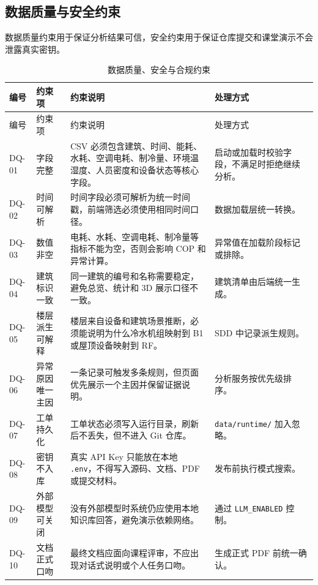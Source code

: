 \documentclass[12pt,a4paper]{ctexart}
\newcommand{\code}[1]{{\footnotesize\nolinkurl{#1}}}
\begin{document}
\subsection{数据质量与安全约束}
数据质量约束用于保证分析结果可信，安全约束用于保证仓库提交和课堂演示不会泄露真实密钥。
\begin{longtable}{L{1.7cm}L{3.0cm}L{6.0cm}L{4.5cm}}
\caption{数据质量、安全与合规约束}\\
\toprule
编号 & 约束项 & 约束说明 & 处理方式 \\
\midrule
\endfirsthead
\toprule
编号 & 约束项 & 约束说明 & 处理方式 \\
\midrule
\endhead
DQ-01 & 字段完整 & CSV 必须包含建筑、时间、能耗、水耗、空调电耗、制冷量、环境温湿度、人员密度和设备状态等核心字段。 & 启动或加载时校验字段，不满足时拒绝继续分析。 \\
DQ-02 & 时间可解析 & 时间字段必须可解析为统一时间戳，前端筛选必须使用相同时间口径。 & 数据加载层统一转换。 \\
DQ-03 & 数值非空 & 电耗、水耗、空调电耗、制冷量等指标不能为空，否则会影响 COP 和异常计算。 & 异常值在加载阶段标记或排除。 \\
DQ-04 & 建筑标识一致 & 同一建筑的编号和名称需要稳定，避免总览、统计和 3D 展示口径不一致。 & 建筑清单由后端统一生成。 \\
DQ-05 & 楼层派生可解释 & 楼层来自设备和建筑场景推断，必须能说明为什么冷水机组映射到 B1 或屋顶设备映射到 RF。 & SDD 中记录派生规则。 \\
DQ-06 & 异常原因唯一主因 & 一条记录可触发多条规则，但页面优先展示一个主因并保留证据说明。 & 分析服务按优先级排序。 \\
DQ-07 & 工单持久化 & 工单状态必须写入运行目录，刷新后不丢失，但不进入 Git 仓库。 & \code{data/runtime/} 加入忽略。 \\
DQ-08 & 密钥不入库 & 真实 API Key 只能放在本地 \code{.env}，不得写入源码、文档、PDF 或提交材料。 & 发布前执行模式搜索。 \\
DQ-09 & 外部模型可关闭 & 没有外部模型时系统仍应使用本地知识库回答，避免演示依赖网络。 & 通过 \code{LLM_ENABLED} 控制。 \\
DQ-10 & 文档正式口吻 & 最终文档应面向课程评审，不应出现对话式说明或个人任务口吻。 & 生成正式 PDF 前统一确认。 \\
\bottomrule
\end{longtable}
\end{document}
